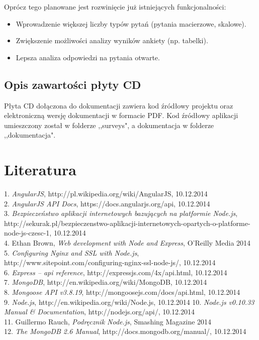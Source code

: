 \documentclass[12pt,a4paper,notitlepage]{article}
\begin{document}
Oprócz tego planowane jest rozwinięcie już istniejących funkcjonalności:
\begin{itemize}
\item Wprowadzenie większej liczby typów pytań (pytania macierzowe, skalowe).
\item Zwiększenie możliwości analizy wyników ankiety (np. tabelki).
\item Lepsza analiza odpowiedzi na pytania otwarte.
\end{itemize}

\subsection{Opis zawartości płyty CD}
Płyta CD dołączona do dokumentacji zawiera kod źródłowy projektu oraz elektroniczną wersję dokumentacji w formacie PDF. Kod źródłowy aplikacji umieszczony został w folderze ,,surveys", a dokumentacja w folderze ,,dokumentacja".

\newpage
\section*{Literatura}

%
1. \textit{AngularJS}, http://pl.wikipedia.org/wiki/AngularJS, 10.12.2014 \\
2. \textit{AngularJS API Docs}, https://docs.angularjs.org/api, 10.12.2014 \\
3. \textit{Bezpieczeństwo aplikacji internetowych bazujących na platformie Node.js}, http://sekurak.pl/bezpieczenstwo-aplikacji-internetowych-opartych-o-platforme-node-js-czesc-1, 10.12.2014 \\
4. Ethan Brown, \textit{Web development with Node and Express}, O’Reilly Media 2014 \\
5. \textit{Configuring Nginx and SSL with Node.js}, http://www.sitepoint.com/configuring-nginx-ssl-node-js/, 10.12.2014 \\
6. \textit{Express – api reference}, http://expressjs.com/4x/api.html, 10.12.2014 \\
7. \textit{MongoDB}, http://en.wikipedia.org/wiki/MongoDB, 10.12.2014 \\ 
8. \textit{Mongoose API v3.8.19}, http://mongoosejs.com/docs/api.html, 10.12.2014 \\
9. \textit{Node.js}, http://en.wikipedia.org/wiki/Node.js, 10.12.2014
10. \textit{Node.js v0.10.33 Manual \& Documentation}, http://nodejs.org/api/, 10.12.2014 \\
11. Guillermo Rauch, \textit{Podręcznik Node.js}, Smashing Magazine 2014 \\
12. \textit{The MongoDB 2.6 Manual}, http://docs.mongodb.org/manual/, 10.12.2014 \\






\newpage
\listoffigures
\newpage
\lstlistoflistings
\newpage
\end{document}
